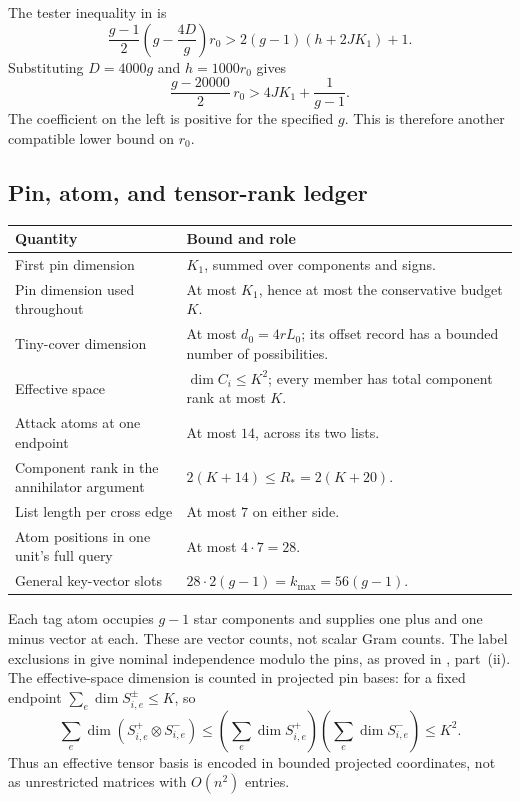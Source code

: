 The tester inequality in  is
\begin{equation}
 \frac{g-1}{2}\left(g-\frac{4D}{g}\right)r_0
          >2(g-1)(h+2JK_1)+1.
 \label{eq:ledger-pure-tester-demand}
\end{equation}
Substituting \(D=4000g\) and \(h=1000r_0\) gives
\[
       \frac{g-20000}{2}\,r_0
             >4JK_1+\frac1{g-1}.
\]
The coefficient on the left is positive for the specified \(g\).
This is therefore another compatible lower bound on \(r_0\).

\subsection{Pin, atom, and tensor-rank ledger}

\begin{center}
\begin{tabular}{@{}p{}p{}@{}}
\toprule
Quantity & Bound and role\\
\midrule
First pin dimension & \(K_1\), summed over components and signs.\\
Pin dimension used throughout & At most \(K_1\), hence at most
the conservative budget \(K\).\\
Tiny-cover dimension & At most \(d_0=4rL_0\); its offset
record has a bounded number of possibilities.\\
Effective space & \(\dim C_i\le K^2\); every member has total component
rank at most \(K\).\\
Attack atoms at one endpoint & At most \(14\), across its two lists.\\
Component rank in the annihilator argument &
\(2(K+14)\le R_*=2(K+20)\).\\
List length per cross edge & At most \(7\) on either side.\\
Atom positions in one unit's full query & At most \(4\cdot7=28\).\\
General key-vector slots &
\(28\cdot2(g-1)=k_{\max}=56(g-1)\).\\
\bottomrule
\end{tabular}
\end{center}

Each tag atom occupies \(g-1\) star components and supplies one plus
and one minus vector at each. These are vector counts, not scalar
Gram counts.
The label exclusions in  give nominal
independence modulo the pins, as proved in
, part~\textup{(ii)}.
The effective-space dimension is counted in projected pin bases:
for a fixed endpoint \(\sum_e\dim S_{i,e}^\pm\le K\), so
\[
 \sum_e\dim(S_{i,e}^+\otimes S_{i,e}^-)
 \le
 \left(\sum_e\dim S_{i,e}^+\right)
 \left(\sum_e\dim S_{i,e}^-\right)
 \le K^2.
\]
Thus an effective tensor basis is encoded in bounded projected
coordinates, not as unrestricted matrices with \(O(n^2)\) entries.

